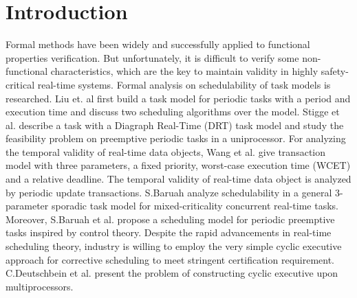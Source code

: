 \documentclass[sigconf]{acmart}
\begin{document}




\maketitle

\section{Introduction}
Formal methods have been widely and successfully applied to functional properties verification. But unfortunately, it is difficult to verify some non-functional characteristics, which are the key to maintain validity in highly safety-critical real-time systems. Formal analysis on schedulability of task models is researched. Liu et. al \cite{DBLP:journals/jacm/LiuL73} first build a task model for periodic tasks with a period and execution time and discuss two scheduling algorithms over the model. Stigge et al. \cite{DBLP:conf/rtas/StiggeEGY11} describe a task with a Diagraph Real-Time (DRT) task model and study the feasibility problem on preemptive periodic tasks in a uniprocessor. For analyzing the temporal validity of real-time data objects, Wang et al. \cite{DBLP:journals/computing/WangLHSM13} give transaction model with three parameters, a fixed priority, worst-case execution time (WCET) and a relative deadline. The temporal validity of real-time data object is  analyzed by periodic update transactions. S.Baruah \cite{DBLP:conf/rtss/Baruah16} analyze schedulability in a general 3-parameter sporadic task model \cite{DBLP:journals/csur/BurnsD17} for mixed-criticality concurrent real-time tasks. Moreover, S.Baruah et al. \cite{DBLP:conf/rtns/2017} propose a scheduling model for periodic preemptive tasks inspired by control theory. Despite the rapid advancements in real-time scheduling theory, industry is willing to employ the very simple cyclic executive approach \cite{DBLP:journals/rts/BakerS89} for corrective scheduling to meet stringent certification requirement. C.Deutschbein et al. \cite{DBLP:conf/setta/2017} present the problem of constructing cyclic executive upon multiprocessors.
\end{document}
